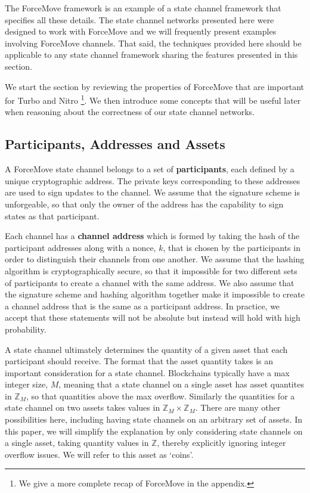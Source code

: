 \documentclass{article}
\theoremstyle{definition}
\begin{document}
The ForceMove framework is an example of a state channel framework that specifies all these details. 
The state channel networks presented here were designed to work with ForceMove and we will frequently present examples involving ForceMove channels.
That said, the techniques provided here should be applicable to any state channel framework sharing the features presented in this section.

We start the section by reviewing the properties of ForceMove that are important for Turbo and Nitro \footnote{We give a more complete recap of ForceMove in the appendix.}. 
We then introduce some concepts that will be useful later when reasoning about the correctness of our state channel networks. 

\subsection{Participants, Addresses and Assets}

A ForceMove state channel belongs to a set of \textbf{participants}, each defined by a unique cryptographic address.
The private keys corresponding to these addresses are used to sign updates to the channel.
We assume that the signature scheme is unforgeable, so that only the owner of the address has the capability to sign states as that participant.

Each channel has a \textbf{channel address} which is formed by taking the hash of the participant addresses along with a nonce, $k$, that is chosen by the participants in order to distinguish their channels from one another.
We assume that the hashing algorithm is cryptographically secure, so that it impossible for two different sets of participants to create a channel with the same address.
We also assume that the signature scheme and hashing algorithm together make it impossible to create a channel address that is the same as a participant address.
In practice, we accept that these statements will not be absolute but instead will hold with high probability.

A state channel ultimately determines the quantity of a given asset that each participant should receive.
The format that the asset quantity takes is an important consideration for a state channel.
Blockchains typically have a max integer size, $M$, meaning that a state channel on a single asset
has asset quantites in $\mathbb{Z}_M$, so that quantities above the max overflow.
Similarly the quantities for a state channel on two assets takes values in $\mathbb{Z}_M \times \mathbb{Z}_M$.
There are many other possibilities here, including having state channels on an arbitrary set of assets.
In this paper, we will simplify the explanation by only considering state channels on a single
asset, taking quantity values in $\mathbb{Z}$, thereby explicitly ignoring integer overflow issues.
We will refer to this asset as `coins'.
\end{document}
